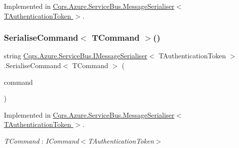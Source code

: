 Implemented in \hyperlink{classCqrs_1_1Azure_1_1ServiceBus_1_1MessageSerialiser_a7b96e89475e9218fcb7a690fe4d02279_a7b96e89475e9218fcb7a690fe4d02279}{Cqrs.\+Azure.\+Service\+Bus.\+Message\+Serialiser$<$ T\+Authentication\+Token $>$}.

\mbox{\label{interfaceCqrs_1_1Azure_1_1ServiceBus_1_1IMessageSerialiser_a7454ac36eca3dd37d0c596e0406b4c81_a7454ac36eca3dd37d0c596e0406b4c81}} 
\subsubsection{\texorpdfstring{Serialise\+Command$<$ T\+Command $>$()}{SerialiseCommand< TCommand >()}}
{\footnotesize\ttfamily string \hyperlink{interfaceCqrs_1_1Azure_1_1ServiceBus_1_1IMessageSerialiser}{Cqrs.\+Azure.\+Service\+Bus.\+I\+Message\+Serialiser}$<$ T\+Authentication\+Token $>$.Serialise\+Command$<$ T\+Command $>$ (\begin{DoxyParamCaption}\item[{T\+Command}]{command }\end{DoxyParamCaption})}



Implemented in \hyperlink{classCqrs_1_1Azure_1_1ServiceBus_1_1MessageSerialiser_a50107f67d604c45136d9fa3d73400e3a_a50107f67d604c45136d9fa3d73400e3a}{Cqrs.\+Azure.\+Service\+Bus.\+Message\+Serialiser$<$ T\+Authentication\+Token $>$}.

\begin{Desc}
\item[Type Constraints]\begin{description}
\item[{\em T\+Command} : {\em I\+Command$<$T\+Authentication\+Token$>$}]\end{description}
\end{Desc}
\mbox{\label{interfaceCqrs_1_1Azure_1_1ServiceBus_1_1IMessageSerialiser_af6e1bca15164a08308969794b089c31b_af6e1bca15164a08308969794b089c31b}} 
